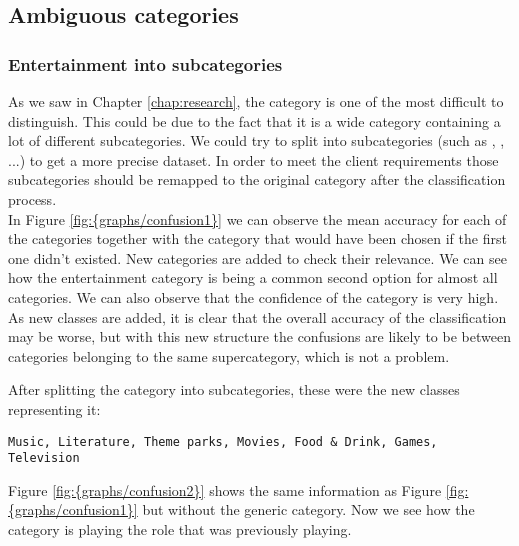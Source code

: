\subsection{Ambiguous categories}


\subsubsection{Entertainment into subcategories}
As we saw in Chapter \ref{chap:research}, the category  is one of the most difficult to distinguish. This could be due to the fact that it is a wide category containing a lot of different
subcategories. We could try to split  into subcategories (such as , , ...) to get a more precise dataset. In order to meet the
client requirements those subcategories should be remapped to the original  category after the classification process. \\
In Figure \ref{fig:{graphs/confusion1}} we can observe the mean accuracy for each of the categories together with the category that would have been chosen if the first one didn't existed. New
categories are added to check their relevance. We can see how the entertainment category is being a common second option for almost all categories. We can also observe that the confidence of the 
 category is very high.
As new classes are added, it is clear that the overall accuracy of the classification may be worse, but with this new structure the confusions are likely to be between categories belonging to the same
supercategory, which is not a problem.

After splitting the  category into subcategories, these were the new classes representing it: \\
\begin{lstlisting} 
Music, Literature, Theme parks, Movies, Food & Drink, Games, Television
\end{lstlisting} 
Figure \ref{fig:{graphs/confusion2}} shows the same information as 
Figure \ref{fig:{graphs/confusion1}} but without the generic  category. Now we see how the  category is playing the role that  was previously playing.


